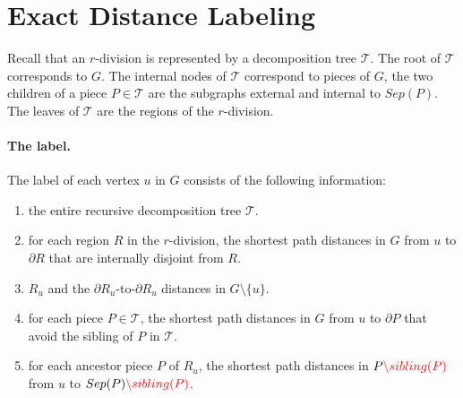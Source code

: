 \documentclass[11pt]{article}
\theoremstyle{plain}
\newcommand{\TG}{\mathcal{T}}
\newcommand{\out}[1]{#1^{out}}
\begin{document}


\section{Exact Distance Labeling}\label{sec:exact}

Recall that an $r$-division is represented by a decomposition tree $\TG$. The root of $\TG$ corresponds to $G$. The internal   nodes of $\TG$ correspond to pieces of $G$, the two children of a piece $P\in \TG$ are the subgraphs external and internal to $Sep(P)$. The leaves of $\TG$ are the regions of the $r$-division.  

\paragraph{The label.}
The label of each vertex $u$ in $G$ consists of the following information:
\begin{enumerate}[label=(\roman*)]
\item \label{item1} the entire recursive decomposition tree $\TG$. 
\item \label{item2} for each region $R$ in the $r$-division, the shortest path distances in $G$ from $u$ to $\partial R$ that are internally disjoint from $R$. 
\item \label{item3} {\color{red} $R_u$ and} the $\partial R_u$-to-$\partial R_u$ distances in $G\setminus\{u\}$.
\item \label{item4} for each piece $P \in \TG$, the shortest path distances in $G$ from $u$ to $\partial P$ that  avoid the sibling of $P$ in $\TG$.
\item \label{item5} for each ancestor piece $P$ of $R_u$, the shortest path distances in $P{\color{red}\setminus sibling(P)}$ from $u$ to $Sep(P){\color{red}\setminus sibling(P)}$. 
\end{enumerate}
 
\end{document}
